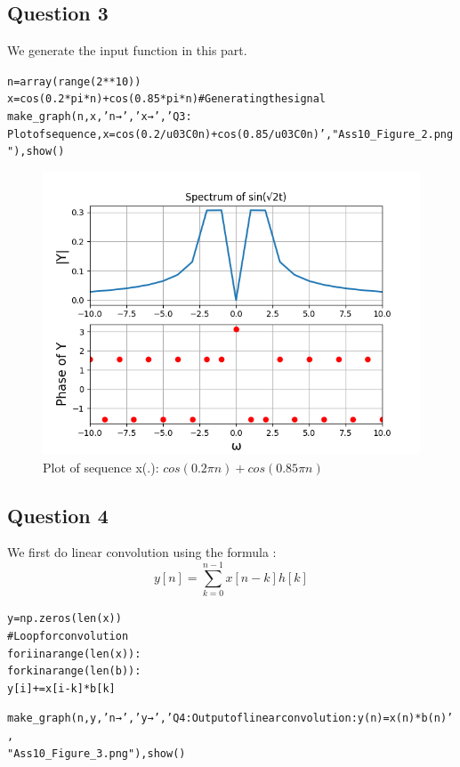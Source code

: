 \documentclass{article}
\begin{document}
\subsection{Question 3}
We generate the input function in this part.
\begin{alltt}
n = array(range(2**10))
x = cos(0.2*pi*n) + cos(0.85*pi*n) # Generating the signal 
make_graph(n, x, 'n →', 'x →', 'Q3: 
Plot of sequence, x = cos(0.2/u03C0n) + cos(0.85/u03C0n)', "Ass10_Figure_2.png"), show()
\end{alltt}

\begin{figure}[h!]
\centering
\includegraphics[scale=0.6]{Figure_1.png}
\caption{Plot of sequence x(.): $cos(0.2\pi n)+cos(0.85\pi n)$}
\label{fig:universe}
\end{figure}

\newpage
\subsection{Question 4}
We first do linear convolution using the formula :
\begin{equation}
    y[n] = \sum_{k=0}^{n-1} x[n-k]h[k]
\end{equation}
\begin{alltt}
y = np.zeros(len(x))
# Loop for convolution
for i in arange(len(x)):
    for k in arange(len(b)):
        y[i] += x[i-k]*b[k]
    
make_graph(n, y, 'n →', 'y →', 'Q4: Output of linear convolution: y(n) = x(n) * b(n)',
"Ass10_Figure_3.png"), show()
\end{alltt}
\end{document}

